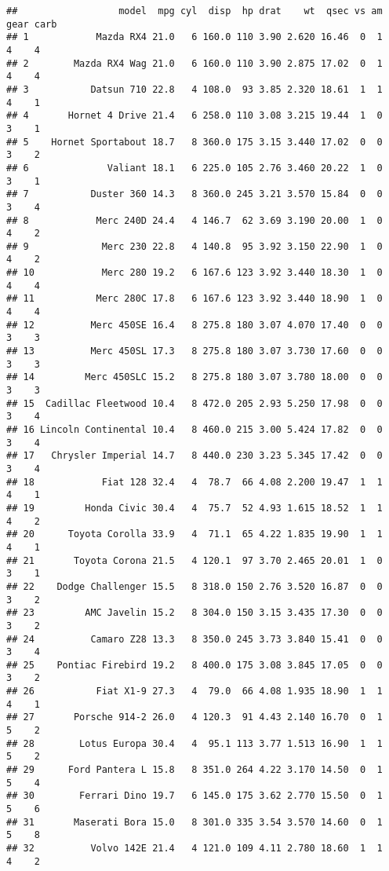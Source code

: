 \documentclass[
]{article}
\begin{document}
\begin{verbatim}
##                  model  mpg cyl  disp  hp drat    wt  qsec vs am gear carb
## 1            Mazda RX4 21.0   6 160.0 110 3.90 2.620 16.46  0  1    4    4
## 2        Mazda RX4 Wag 21.0   6 160.0 110 3.90 2.875 17.02  0  1    4    4
## 3           Datsun 710 22.8   4 108.0  93 3.85 2.320 18.61  1  1    4    1
## 4       Hornet 4 Drive 21.4   6 258.0 110 3.08 3.215 19.44  1  0    3    1
## 5    Hornet Sportabout 18.7   8 360.0 175 3.15 3.440 17.02  0  0    3    2
## 6              Valiant 18.1   6 225.0 105 2.76 3.460 20.22  1  0    3    1
## 7           Duster 360 14.3   8 360.0 245 3.21 3.570 15.84  0  0    3    4
## 8            Merc 240D 24.4   4 146.7  62 3.69 3.190 20.00  1  0    4    2
## 9             Merc 230 22.8   4 140.8  95 3.92 3.150 22.90  1  0    4    2
## 10            Merc 280 19.2   6 167.6 123 3.92 3.440 18.30  1  0    4    4
## 11           Merc 280C 17.8   6 167.6 123 3.92 3.440 18.90  1  0    4    4
## 12          Merc 450SE 16.4   8 275.8 180 3.07 4.070 17.40  0  0    3    3
## 13          Merc 450SL 17.3   8 275.8 180 3.07 3.730 17.60  0  0    3    3
## 14         Merc 450SLC 15.2   8 275.8 180 3.07 3.780 18.00  0  0    3    3
## 15  Cadillac Fleetwood 10.4   8 472.0 205 2.93 5.250 17.98  0  0    3    4
## 16 Lincoln Continental 10.4   8 460.0 215 3.00 5.424 17.82  0  0    3    4
## 17   Chrysler Imperial 14.7   8 440.0 230 3.23 5.345 17.42  0  0    3    4
## 18            Fiat 128 32.4   4  78.7  66 4.08 2.200 19.47  1  1    4    1
## 19         Honda Civic 30.4   4  75.7  52 4.93 1.615 18.52  1  1    4    2
## 20      Toyota Corolla 33.9   4  71.1  65 4.22 1.835 19.90  1  1    4    1
## 21       Toyota Corona 21.5   4 120.1  97 3.70 2.465 20.01  1  0    3    1
## 22    Dodge Challenger 15.5   8 318.0 150 2.76 3.520 16.87  0  0    3    2
## 23         AMC Javelin 15.2   8 304.0 150 3.15 3.435 17.30  0  0    3    2
## 24          Camaro Z28 13.3   8 350.0 245 3.73 3.840 15.41  0  0    3    4
## 25    Pontiac Firebird 19.2   8 400.0 175 3.08 3.845 17.05  0  0    3    2
## 26           Fiat X1-9 27.3   4  79.0  66 4.08 1.935 18.90  1  1    4    1
## 27       Porsche 914-2 26.0   4 120.3  91 4.43 2.140 16.70  0  1    5    2
## 28        Lotus Europa 30.4   4  95.1 113 3.77 1.513 16.90  1  1    5    2
## 29      Ford Pantera L 15.8   8 351.0 264 4.22 3.170 14.50  0  1    5    4
## 30        Ferrari Dino 19.7   6 145.0 175 3.62 2.770 15.50  0  1    5    6
## 31       Maserati Bora 15.0   8 301.0 335 3.54 3.570 14.60  0  1    5    8
## 32          Volvo 142E 21.4   4 121.0 109 4.11 2.780 18.60  1  1    4    2
\end{verbatim}
\end{document}

